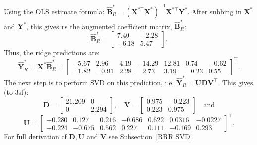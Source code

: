 \documentclass[11pt]{report} %
\begin{document}
\noindent Using the OLS estimate formula: $\hat{\mathbf{B}}^*_R = (\mathbf{X}^{*\top} \mathbf{X}^*)^{-1} \mathbf{X}^{*\top} \mathbf{Y}^*$. After subbing in $\mathbf{X}^*$ and $\mathbf{Y}^*$, this gives us the augmented coefficient matrix, $\hat{\mathbf{B}}^*_R$:
\[
\hat{\mathbf{B}}^*_R =
\begin{bmatrix}
7.40 & -2.28 \\
-6.18 & 5.47
\end{bmatrix}.
\]
\vspace{-0.3cm}
Thus, the ridge predictions are:
\[
\hat{\mathbf{Y}}^*_R =
\mathbf{X}^* \hat{\mathbf{B}}^*_R
=
\begin{bmatrix}
-5.67 & 2.96 & 4.19 & -14.29 & 12.81 & 0.74 & -0.62 \\
-1.82 & -0.91 & 2.28 & -2.73 & 3.19 & -0.23 & 0.55
\end{bmatrix}^{\top}.
\]
The next step is to perform SVD on this prediction, i.e. $\hat{\mathbf{Y}}^*_R = \mathbf{U} \mathbf{D} \mathbf{V}^\top$. This gives (to 3sf):
\[
\mathbf{D} =
\begin{bmatrix}
21.209 & 0 \\
0 & 2.294
\end{bmatrix}, \quad
\mathbf{V} =
\begin{bmatrix}
0.975 & -0.223 \\
0.223 & 0.975
\end{bmatrix} \quad \text{and}
\]
\[
\mathbf{U} =
\begin{bmatrix}
-0.280 & 0.127 & 0.216 & -0.686 & 0.622 & 0.0316 & -0.0227 \\
-0.224 & -0.675 & 0.562 & 0.227 & 0.111 & -0.169 & 0.293
\end{bmatrix}^{\top}.
\]
For full derivation of $\mathbf{D}, \mathbf{U}$ and $\mathbf{V}$ see Subsection~\ref{RRR SVD}. 
\end{document}
